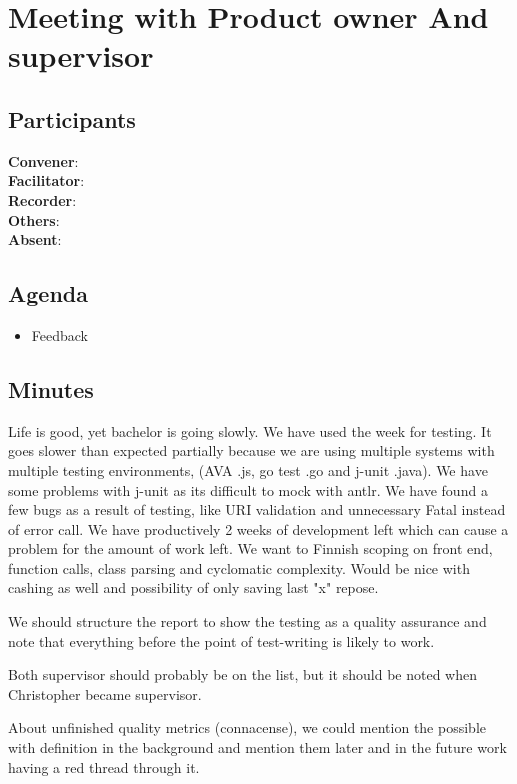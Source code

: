 \section*{Meeting with Product owner And supervisor}
\subsection*{Participants}
\textbf{Convener}: \productowner{}\\
\textbf{Facilitator}: \facilitator{}  \\
\textbf{Recorder}: \scrummaster{}  \\
\textbf{Others}: \groupleader{} \\
\textbf{Absent}: 

\subsection*{Agenda}
\begin{itemize}
    \item Feedback
\end{itemize}

\subsection*{Minutes}
Life is good, yet bachelor is going slowly. We have used the week for testing. It goes slower than expected partially because we are using multiple systems with multiple testing environments, (AVA .js, go test .go and j-unit .java). We have some problems with j-unit as its difficult to mock with antlr. We have found a few bugs as a result of testing, like URI validation and unnecessary Fatal instead of error call. 
We have productively 2 weeks of development left which can cause a problem for the amount of work left. 
We want to Finnish scoping on front end, function calls, class parsing and cyclomatic complexity. Would be nice with cashing as well and  possibility of only saving last "x" repose.

We should structure the report to show the testing as a quality assurance and note that everything before the point of test-writing is likely to work.

Both supervisor should probably be on the list, but it should be noted when Christopher became supervisor.

About unfinished quality metrics (connacense), we could mention the possible with definition in the background and mention them later and in the future work having a red thread through it. 
\newpage